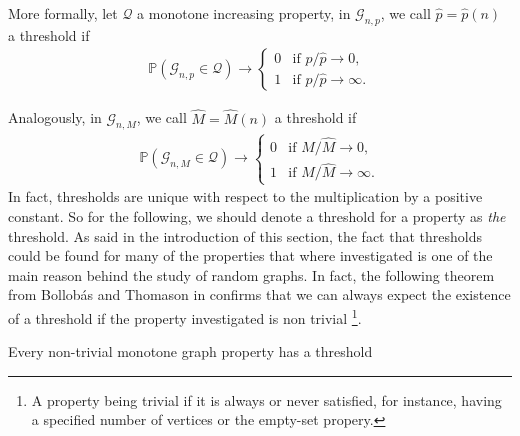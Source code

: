 More formally, let $\mathcal{Q}$ a monotone increasing property,  in $\mathcal{G}_{n, p}$, we call $\hat{p} = \hat{p}(n)$ a threshold if
\begin{align}
	\mathbb{P}(\mathcal{G}_{n,p} \in \mathcal{Q}) \rightarrow \left\{\begin{array}{rl}
										0 & \text{if } p / \hat{p} \to 0,\\
										1 & \text{if } p / \hat{p} \to \infty.
									 \end{array}
									\right.
\end{align}

Analogously, in $\mathcal{G}_{n, M}$, we call $\hat{M} = \hat{M}(n)$ a threshold if
\begin{align}
	\mathbb{P}(\mathcal{G}_{n,M} \in \mathcal{Q}) \rightarrow \left\{\begin{array}{rl}
										0 & \text{if } M / \hat{M} \to 0,\\
										1 & \text{if } M / \hat{M} \to \infty.
									 \end{array}
									\right.
\end{align}
In fact, thresholds are unique with respect to the multiplication by a positive constant. So for the following, we should denote a threshold for a property as \emph{the} threshold.
\newline
As said in the introduction of this section, the fact that thresholds could be found for many of the properties that where investigated is one of the main reason behind the study of random graphs.
In fact, the following theorem from Bollob\'as and Thomason in \cite{Bollob87} confirms that we can always expect the existence of a threshold if the property investigated is non trivial
\footnote{A property being trivial if it is always or never satisfied, for instance, having a specified number of vertices or the empty-set propery.}.
\begin{theorem}
	Every non-trivial monotone graph property has a threshold
\end{theorem}
